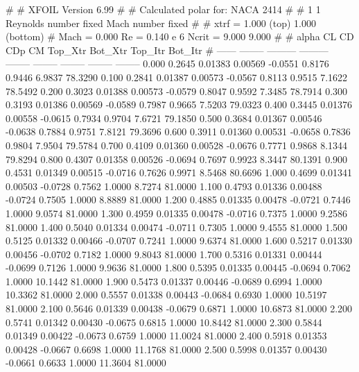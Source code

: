 #  
#       XFOIL         Version 6.99
#  
# Calculated polar for: NACA 2414                                       
#  
# 1 1 Reynolds number fixed          Mach number fixed         
#  
# xtrf =   1.000 (top)        1.000 (bottom)  
# Mach =   0.000     Re =     0.140 e 6     Ncrit =   9.000  9.000
#  
#   alpha    CL        CD       CDp       CM     Top_Xtr  Bot_Xtr  Top_Itr  Bot_Itr
#  ------ -------- --------- --------- -------- -------- -------- -------- --------
   0.000   0.2645   0.01383   0.00569  -0.0551   0.8176   0.9446   6.9837  78.3290
   0.100   0.2841   0.01387   0.00573  -0.0567   0.8113   0.9515   7.1622  78.5492
   0.200   0.3023   0.01388   0.00573  -0.0579   0.8047   0.9592   7.3485  78.7914
   0.300   0.3193   0.01386   0.00569  -0.0589   0.7987   0.9665   7.5203  79.0323
   0.400   0.3445   0.01376   0.00558  -0.0615   0.7934   0.9704   7.6721  79.1850
   0.500   0.3684   0.01367   0.00546  -0.0638   0.7884   0.9751   7.8121  79.3696
   0.600   0.3911   0.01360   0.00531  -0.0658   0.7836   0.9804   7.9504  79.5784
   0.700   0.4109   0.01360   0.00528  -0.0676   0.7771   0.9868   8.1344  79.8294
   0.800   0.4307   0.01358   0.00526  -0.0694   0.7697   0.9923   8.3447  80.1391
   0.900   0.4531   0.01349   0.00515  -0.0716   0.7626   0.9971   8.5468  80.6696
   1.000   0.4699   0.01341   0.00503  -0.0728   0.7562   1.0000   8.7274  81.0000
   1.100   0.4793   0.01336   0.00488  -0.0724   0.7505   1.0000   8.8889  81.0000
   1.200   0.4885   0.01335   0.00478  -0.0721   0.7446   1.0000   9.0574  81.0000
   1.300   0.4959   0.01335   0.00478  -0.0716   0.7375   1.0000   9.2586  81.0000
   1.400   0.5040   0.01334   0.00474  -0.0711   0.7305   1.0000   9.4555  81.0000
   1.500   0.5125   0.01332   0.00466  -0.0707   0.7241   1.0000   9.6374  81.0000
   1.600   0.5217   0.01330   0.00456  -0.0702   0.7182   1.0000   9.8043  81.0000
   1.700   0.5316   0.01331   0.00444  -0.0699   0.7126   1.0000   9.9636  81.0000
   1.800   0.5395   0.01335   0.00445  -0.0694   0.7062   1.0000  10.1442  81.0000
   1.900   0.5473   0.01337   0.00446  -0.0689   0.6994   1.0000  10.3362  81.0000
   2.000   0.5557   0.01338   0.00443  -0.0684   0.6930   1.0000  10.5197  81.0000
   2.100   0.5646   0.01339   0.00438  -0.0679   0.6871   1.0000  10.6873  81.0000
   2.200   0.5741   0.01342   0.00430  -0.0675   0.6815   1.0000  10.8442  81.0000
   2.300   0.5844   0.01349   0.00422  -0.0673   0.6759   1.0000  11.0024  81.0000
   2.400   0.5918   0.01353   0.00428  -0.0667   0.6698   1.0000  11.1768  81.0000
   2.500   0.5998   0.01357   0.00430  -0.0661   0.6633   1.0000  11.3604  81.0000
